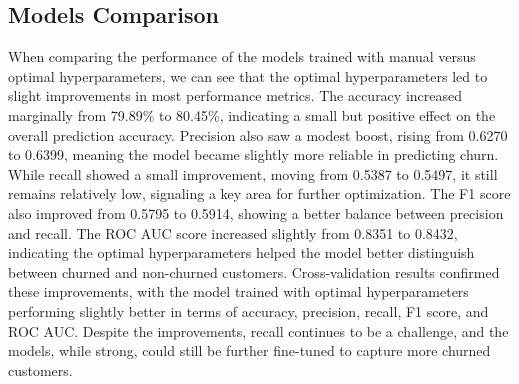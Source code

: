 \subsection{Models Comparison}
When comparing the performance of the models trained with manual versus optimal hyperparameters, we can see that the optimal hyperparameters led to slight improvements in most performance metrics. The accuracy increased marginally from 79.89\% to 80.45\%, indicating a small but positive effect on the overall prediction accuracy. Precision also saw a modest boost, rising from 0.6270 to 0.6399, meaning the model became slightly more reliable in predicting churn. While recall showed a small improvement, moving from 0.5387 to 0.5497, it still remains relatively low, signaling a key area for further optimization. The F1 score also improved from 0.5795 to 0.5914, showing a better balance between precision and recall. The ROC AUC score increased slightly from 0.8351 to 0.8432, indicating the optimal hyperparameters helped the model better distinguish between churned and non-churned customers. Cross-validation results confirmed these improvements, with the model trained with optimal hyperparameters performing slightly better in terms of accuracy, precision, recall, F1 score, and ROC AUC. Despite the improvements, recall continues to be a challenge, and the models, while strong, could still be further fine-tuned to capture more churned customers.
